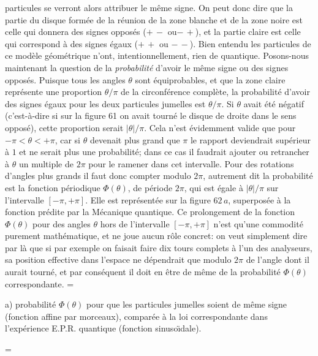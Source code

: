 particules se verront alors attribuer le m\^eme signe. On peut donc dire 
que la partie du disque form\'ee de la r\'eunion de la zone blanche et de  
la zone noire est celle  qui donnera des signes oppos\'es ($+\, -$ ou$-\, 
+$), et la partie claire  est celle qui correspond \`a des signes \'egaux 
($+\, +$ ou $-\, -$).    
\medskip 
Bien entendu les particules de ce mod\`ele g\'eom\'etrique n'ont,
intentionnellement, rien de quantique.  
\medskip 
Posons-nous maintenant la question de la {\it probabilit\'e} d'avoir 
le m\^eme signe ou des signes oppos\'es. Puisque tous les angles  
$\theta$ sont \'equiprobables, et que la  zone claire repr\'esente une 
proportion $\theta / \pi$ de la circonf\'erence compl\`ete, la 
probabilit\'e d'avoir des signes \'egaux pour les deux particules jumelles 
est $\theta / \pi$. Si $\theta$ avait \'et\'e n\'egatif (c'est-\`a-dire si 
sur la figure 61 on avait tourn\'e le disque de droite dans le sens 
oppos\'e), cette proportion serait $|\theta | / \pi$. Cela   n'est 
\'evidemment valide que pour $-\pi < \theta < +\pi$, car si $\theta$ 
devenait plus grand que $\pi$ le rapport deviendrait sup\'erieur \`a  
$1$  et ne serait plus une probabilit\'e; dans ce cas il faudrait ajouter  
ou retrancher \`a $\theta$ un multiple de $2\pi$ pour le ramener dans  
cet intervalle. Pour des rotations d'angles plus grands il faut donc 
compter modulo $2\pi$,  autrement dit la probabilit\'e est la fonction  
p\'eriodique $\Phi (\theta )$, de p\'eriode $2\pi$, qui est \'egale \`a 
$|\theta | / \pi$ sur l'intervalle $[-\pi , +\pi ]$. Elle est repr\'esent\'ee 
sur la figure $62\, a$, superpos\'ee \`a la fonction pr\'edite par la 
M\'ecanique quantique. 
\medskip 
Ce prolongement de la fonction $\Phi (\theta )$
pour des angles $\theta$ hors de l'intervalle  $[-\pi , +\pi ]$ n'est qu'une
commodit\'e purement math\'ematique, et ne joue aucun r\^ole concret: 
on veut simplement dire par l\`a que si par exemple on faisait faire dix 
tours complets \`a l'un des analyseurs, sa position effective dans
l'espace ne d\'ependrait que modulo $2\pi$ de l'angle dont il aurait 
tourn\'e,  et par cons\'equent il doit en \^etre de m\^eme de la
probabilit\'e $\Phi (\theta )$ correspondante.
\medskip 
\midinsert 
\epsfxsize=\hsize
{} 
\vskip3mm
\centerline{\vbox{\hsize=11cm 
\eightpoint a) probabilit\'e $\Phi (\theta )$ pour que les 
particules jumelles soient de m\^eme signe (fonction 
affine par morceaux), compar\'ee  \`a la loi correspondante dans 
l'exp\'erience E.P.R. quantique (fonction sinuso\"\i dale).}  } 
\vskip5mm
\epsfxsize=\hsize
